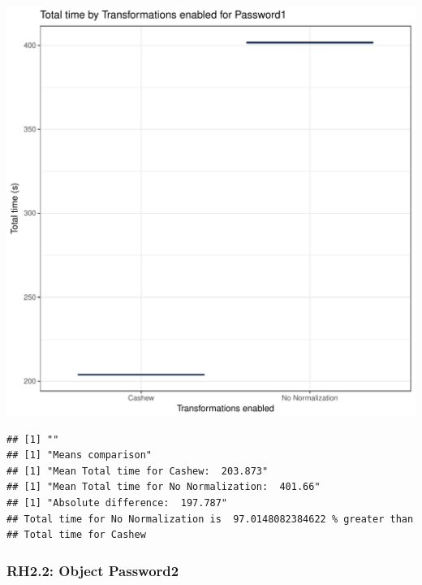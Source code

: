 \documentclass{article}\usepackage[]{graphicx}\usepackage[]{color}
\makeatletter
\def\maxwidth{ %
  \ifdim\Gin@nat@width>\linewidth
    \linewidth
  \else
    \Gin@nat@width
  \fi
}
\newenvironment{kframe}{%
 \def\at@end@of@kframe{}%
 \ifinner\ifhmode%
  \def\at@end@of@kframe{\end{minipage}}%
  \begin{minipage}{\columnwidth}%
 \fi\fi%
 \def\FrameCommand##1{\hskip\@totalleftmargin \hskip-\fboxsep
 \colorbox{shadecolor}{##1}\hskip-\fboxsep
     \hskip-\linewidth \hskip-\@totalleftmargin \hskip\columnwidth}%
 \MakeFramed {\advance\hsize-\width
   \@totalleftmargin\z@ \linewidth\hsize
   \@setminipage}}%
 {\par\unskip\endMakeFramed%
 \at@end@of@kframe}
\newenvironment{knitrout}{}{} %
\makeatother
\begin{document}
\begin{knitrout}
\color{fgcolor}
\includegraphics[width=\maxwidth]{figure/RH2_password-1} 
\begin{kframe}

{\ttfamily\noindent\bfseries\color{errorcolor}{\#\# Error in eval(expr, envir, enclos): object 'shap\_cashew\_password' not found}}\begin{verbatim}
## [1] ""
## [1] "Means comparison"
## [1] "Mean Total time for Cashew:  203.873"
## [1] "Mean Total time for No Normalization:  401.66"
## [1] "Absolute difference:  197.787"
## Total time for No Normalization is  97.0148082384622 % greater than 
## Total time for Cashew
\end{verbatim}
\end{kframe}
\end{knitrout}


\subsubsection{RH2.2: Object Password2}
\end{document}
